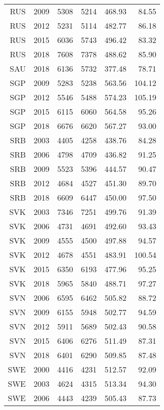 \begin{longtable}{|r|r|r|r|r|r|}
    RUS   & 2009  & 5308  & 5214  & 468.93 & 84.55 \\
    RUS   & 2012  & 5231  & 5114  & 482.77 & 86.18 \\
    RUS   & 2015  & 6036  & 5743  & 496.42 & 83.32 \\
    RUS   & 2018  & 7608  & 7378  & 488.62 & 85.90 \\
    SAU   & 2018  & 6136  & 5732  & 377.48 & 78.71 \\
    SGP   & 2009  & 5283  & 5238  & 563.56 & 104.12 \\
    SGP   & 2012  & 5546  & 5488  & 574.23 & 105.19 \\
    SGP   & 2015  & 6115  & 6060  & 564.58 & 95.26 \\
    SGP   & 2018  & 6676  & 6620  & 567.27 & 93.00 \\
    SRB   & 2003  & 4405  & 4258  & 438.76 & 84.28 \\
    SRB   & 2006  & 4798  & 4709  & 436.82 & 91.25 \\
    SRB   & 2009  & 5523  & 5396  & 444.57 & 90.47 \\
    SRB   & 2012  & 4684  & 4527  & 451.30 & 89.70 \\
    SRB   & 2018  & 6609  & 6447  & 450.00 & 97.50 \\
    SVK   & 2003  & 7346  & 7251  & 499.76 & 91.39 \\
    SVK   & 2006  & 4731  & 4691  & 492.60 & 93.43 \\
    SVK   & 2009  & 4555  & 4500  & 497.88 & 94.57 \\
    SVK   & 2012  & 4678  & 4551  & 483.91 & 100.54 \\
    SVK   & 2015  & 6350  & 6193  & 477.96 & 95.25 \\
    SVK   & 2018  & 5965  & 5840  & 488.71 & 97.27 \\
    SVN   & 2006  & 6595  & 6462  & 505.82 & 88.72 \\
    SVN   & 2009  & 6155  & 5948  & 502.77 & 94.59 \\
    SVN   & 2012  & 5911  & 5689  & 502.43 & 90.58 \\
    SVN   & 2015  & 6406  & 6276  & 511.49 & 87.31 \\
    SVN   & 2018  & 6401  & 6290  & 509.85 & 87.48 \\
    SWE   & 2000  & 4416  & 4231  & 512.57 & 92.09 \\
    SWE   & 2003  & 4624  & 4315  & 513.34 & 94.30 \\
    SWE   & 2006  & 4443  & 4239  & 505.43 & 87.73 \\

\end{longtable}

